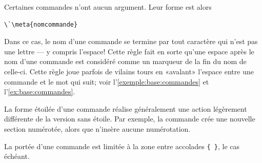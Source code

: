 Certaines commandes n'ont aucun argument. Leur forme est alors
\begin{lstlisting}
\`\meta{nomcommande}
\end{lstlisting}
Dans ce cas, le nom d'une commande se termine par tout caractère qui
n'est pas une lettre --- y compris l'espace! Cette règle fait en sorte
qu'une espace après le nom d'une commande est considéré comme un
marqueur de la fin du nom de celle-ci. Cette règle joue parfois de
vilains tours en «avalant» l'espace entre une commande et le mot qui
suit; voir l'\autoref{exemple:base:commandes} et
l'\autoref{ex:base:commandes}.

La forme étoilée d'une commande réalise généralement une action
légèrement différente de la version sans étoile. Par exemple, la
commande \cmd{\section} crée une nouvelle section numérotée, alors que
\cmd{\section*} n'insère aucune numérotation.

La portée d'une commande est limitée à la zone entre accolades
\verb={ }=, le cas échéant.

